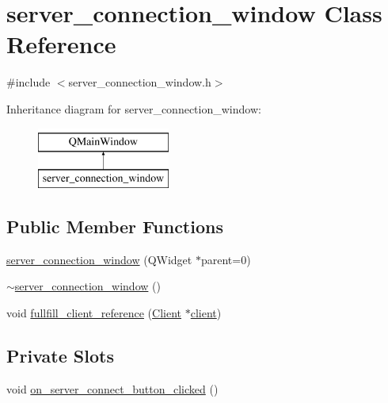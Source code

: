 \hypertarget{classserver__connection__window}{\section{server\-\_\-connection\-\_\-window Class Reference}
\label{classserver__connection__window}
}


{\ttfamily \#include $<$server\-\_\-connection\-\_\-window.\-h$>$}

Inheritance diagram for server\-\_\-connection\-\_\-window\-:\begin{figure}[H]
\begin{center}
\leavevmode
\includegraphics[height=2.000000cm]{classserver__connection__window}
\end{center}
\end{figure}
\subsection*{Public Member Functions}
\begin{DoxyCompactItemize}
\item 
\hyperlink{classserver__connection__window_a5c4228ae40722c21d5aaf33044d65e8c}{server\-\_\-connection\-\_\-window} (Q\-Widget $\ast$parent=0)
\item 
\hyperlink{classserver__connection__window_a4cb59e06328d101c22a5a0d1a0285faf}{$\sim$server\-\_\-connection\-\_\-window} ()
\item 
void \hyperlink{classserver__connection__window_a0e494399c11e10e00688bcbca8dc7053}{fullfill\-\_\-client\-\_\-reference} (\hyperlink{classClient}{Client} $\ast$\hyperlink{classserver__connection__window_aedf2c1c7bec9b66101617dfd75cc61cc}{client})
\end{DoxyCompactItemize}
\subsection*{Private Slots}
\begin{DoxyCompactItemize}
\item 
void \hyperlink{classserver__connection__window_afed61024df5469b7a947f53b1fa1c1da}{on\-\_\-server\-\_\-connect\-\_\-button\-\_\-clicked} ()
\end{DoxyCompactItemize}
